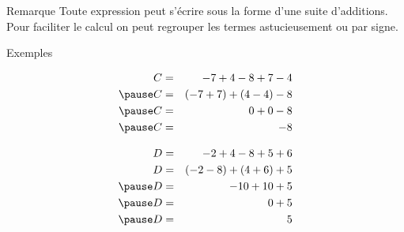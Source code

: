 \documentclass[xcolor={dvipsnames}]{beamer}
\begin{document}
\begin{frame}
	\begin{block}{Remarque}
		Toute expression peut s'écrire sous la forme d'une suite d'additions.  Pour faciliter le calcul on peut regrouper les termes astucieusement ou par signe.
	\end{block}
	
	\begin{exampleblock}{Exemples}
		
		\begin{eqnarray*}
			C &=& - 7 + 4 - 8 + 7 - 4 \\ \pause
			C &=& (- 7 + 7) + (4 - 4) - 8  \\ \pause
			C &=& 0 + 0 - 8 \\ \pause
			C &=& -8
		\end{eqnarray*}
		
		\vspace*{-0.75cm}
		
		\begin{eqnarray*}
			D &=& -2 + 4 - 8 + 5 + 6 \\
			D &=& (- 2 - 8) + (4 + 6) + 5 \\ \pause
			D &=& -10 + 10 + 5 \\ \pause
			D &=& 0 + 5 \\ \pause
			D &=& 5
		\end{eqnarray*}
	\end{exampleblock}
\end{frame}
\end{document}
